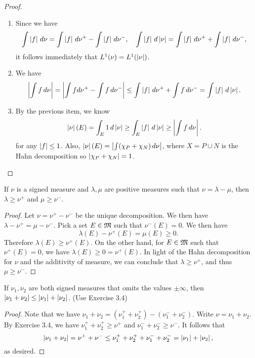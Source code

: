 \documentclass[a4paper]{article}
\begin{document}
\begin{proof}
\begin{enumerate}
\item Since we have 
\[
\int \left\lvert f\right\rvert \, d \nu = \int \left\lvert f\right\rvert \, d \nu^+ - \int \left\lvert f\right\rvert \, d \nu^-, 
\quad 
\int \left\lvert f\right\rvert \, d \left\lvert \nu\right\rvert = \int \left\lvert f\right\rvert \, d \nu^+ + \int \left\lvert f\right\rvert 
\, d \nu^-,
\]
it follows immediately that $L^1 (\nu) = L^1 (\left\lvert \nu\right\rvert)$.

\item We have 
\[
\begin{aligned}
\left\lvert \int f \, d \nu\right\rvert = \left\lvert \int f d \nu^+ - \int f \, d \nu^-\right\rvert 
\leq \int \left\lvert f\right\rvert \, d \nu^+ + \int f \, d \nu^- 
= \int \left\lvert f\right\rvert \, d \left\lvert \nu\right\rvert.
\end{aligned}
\]

\item By the previous item, we know
\[
\left\lvert \nu\right\rvert (E) = \int_E 1 \, d \left\lvert \nu\right\rvert \geq \int_E \left\lvert f\right\rvert 
\, d \left\lvert \nu\right\rvert \geq \left\lvert \int f \, d \nu\right\rvert.
\]
for any $\left\lvert f\right\rvert \leq 1$. Also, $\left\lvert \nu\right\rvert(E) = 
\left\lvert \int (\chi_P + \chi_N) \, d \nu\right\rvert$, where $X = P \cup N$ is the 
Hahn decomposition so $\left\lvert \chi_P + \chi_N\right\rvert = 1$.
\end{enumerate}
\end{proof}

\begin{ex}[Folland 3.4]
If $\nu$ is a signed measure and $\lambda, \mu$ are positive
measures such that $\nu = \lambda - \mu$, then $\lambda \geq \nu^+$
and $\mu \geq \nu^-$.
\end{ex}

\begin{proof}
Let $\nu = \nu^+ - \nu^-$ be the unique decomposition. 
We then have $\lambda - \nu^+ = \mu - \nu^-$. Pick a set $E \in \mathfrak{M}$
such that $\nu^- (E) = 0$. We then have 
\[
\lambda (E) - \nu^+ (E) = \mu (E) \geq 0.
\]
Therefore $\lambda (E) \geq \nu^+ (E)$. On the other hand,
for $E \in \mathfrak{M}$ such that $\nu^+ (E) = 0$, we have 
$\lambda (E) \geq 0 = \nu^+ (E)$. In light of the Hahn 
decomposition for $\nu$ and the additivity of measure, 
we can conclude that $\lambda \geq \nu^+$, and thus
$\mu \geq \nu^-$.
\end{proof}

\begin{ex}[Folland 3.5]
If $\nu_1, \nu_2$ are both signed measures that omits the values 
$\pm \infty$, then $\left\lvert \nu_1 + \nu_2\right\rvert \leq \left\lvert \nu_1\right\rvert + \left\lvert \nu_2\right\rvert$.
(Use Exercise 3.4)
\end{ex}

\begin{proof}
Note that we have $\nu_1 + \nu_2 = (\nu_1^+ +  \nu_2^+)
- (\nu_1^- + \nu_2^-)$. Write $\nu = \nu_1 + \nu_2$. 
By Exercise 3.4, we have 
$\nu_1^+ + \nu_2^+ \geq \nu^+$ and $\nu_1^- + \nu_2^- 
\geq \nu^-$. It follows that 
\[
\left\lvert \nu_1 + \nu_2\right\rvert = \nu^+ + \nu^- 
\leq \nu_1^+ + \nu_2^+ + \nu_1^- + \nu_2^- 
= \left\lvert \nu_1\right\rvert + \left\lvert \nu_2\right\rvert,
\]
as desired.
\end{proof}
\end{document}
